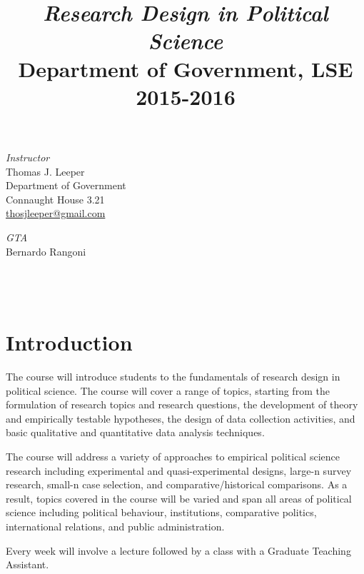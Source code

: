 \documentclass[12pt,a4paper]{article}
\title{\textit{Research Design in Political Science}\\Department of Government, LSE\\2015-2016}
\author{}
\date{}
\begin{document}
\nobibliography*
\faketableofcontents

\maketitle

\vspace{-4em}

\begin{minipage}[b]{0.5\linewidth}
\textit{Instructor}\\
Thomas J. Leeper\\
Department of Government\\
Connaught House 3.21\\
\href{mailto:thosjleeper@gmail.com}{thosjleeper@gmail.com}\\
\end{minipage}
\begin{minipage}[b]{0.5\linewidth}
\textit{GTA}\\
Bernardo Rangoni\\
\hspace{1em}\\
\hspace{1em}\\
\hspace{1em}\\
\end{minipage}


\section{Introduction}
The course will introduce students to the fundamentals of research design in political science. The course will cover a range of topics, starting from the formulation of research topics and research questions, the development of theory and empirically testable hypotheses, the design of data collection activities, and basic qualitative and quantitative data analysis techniques. 

The course will address a variety of approaches to empirical political science research including experimental and quasi-experimental designs, large-n survey research, small-n case selection, and comparative/historical comparisons. As a result, topics covered in the course will be varied and span all areas of political science including political behaviour, institutions, comparative politics, international relations, and public administration.

Every week will involve a lecture followed by a class with a Graduate Teaching Assistant. 
\end{document}
